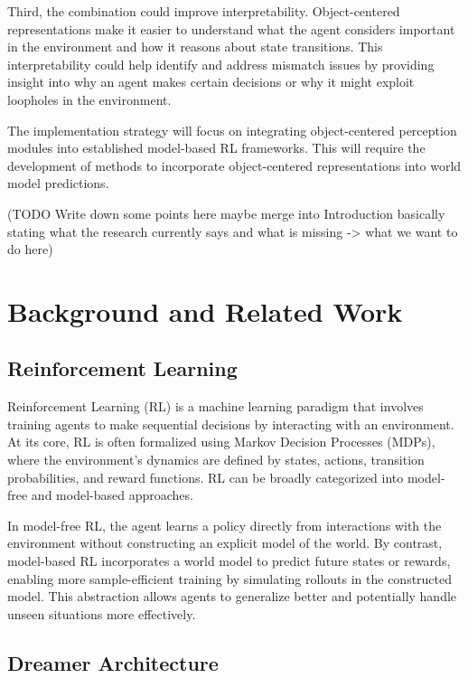 \documentclass[
	english,
	ruledheaders=section,
	class=report,
	thesis={type=master},
	accentcolor=9c,
	custommargins=true,
	marginpar=false,
	parskip=half-,
	fontsize=11pt,
]{tudapub}
\begin{document}
Third, the combination could improve interpretability. Object-centered representations make it easier to understand what the agent considers important in the environment and how it reasons 
about state transitions. This interpretability could help identify and address mismatch issues by providing insight into why an agent makes certain decisions or why it might exploit loopholes in the environment.

The implementation strategy will focus on integrating object-centered perception modules into established model-based RL frameworks. This will require the development of methods to incorporate
 object-centered representations into world model predictions.

(TODO Write down some points here maybe merge into Introduction basically stating what the research currently says and what is missing -> what we want to do here)

\chapter{Background and Related Work}
\label{chap:background}

\section{Reinforcement Learning}
\label{sec:reinforcement_learning}

Reinforcement Learning (RL) is a machine learning paradigm that involves training agents to make sequential decisions by interacting with an environment. At its core, RL is often formalized using Markov Decision Processes (MDPs), where the environment's dynamics are defined by states, actions, transition probabilities, and reward functions. RL can be broadly categorized into model-free and model-based approaches.

In model-free RL, the agent learns a policy directly from interactions with the environment without constructing an explicit model of the world. By contrast, model-based RL incorporates a world model to predict future states or rewards, enabling more sample-efficient training by simulating rollouts in the constructed model. This abstraction allows agents to generalize better and potentially handle unseen situations more effectively.

\section{Dreamer Architecture}
\label{sec:dreamer_architecture}
\end{document}
